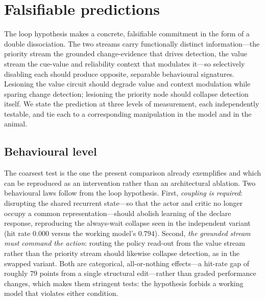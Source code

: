 \section{Falsifiable predictions}

The loop hypothesis makes a concrete, falsifiable commitment in the form of a double dissociation. The two streams carry functionally distinct information---the priority stream the grounded change-evidence that drives detection, the value stream the cue-value and reliability context that modulates it---so selectively disabling each should produce opposite, separable behavioural signatures. Lesioning the value circuit should degrade value and context modulation while sparing change detection; lesioning the priority node should collapse detection itself. We state the prediction at three levels of measurement, each independently testable, and tie each to a corresponding manipulation in the model and in the animal.

\subsection{Behavioural level}

The coarsest test is the one the present comparison already exemplifies and which can be reproduced as an intervention rather than an architectural ablation. Two behavioural laws follow from the loop hypothesis. First, \emph{coupling is required}: disrupting the shared recurrent state---so that the actor and critic no longer occupy a common representation---should abolish learning of the declare response, reproducing the always-wait collapse seen in the independent variant (hit rate $0.000$ versus the working model's $0.794$). Second, \emph{the grounded stream must command the action}: routing the policy read-out from the value stream rather than the priority stream should likewise collapse detection, as in the swapped variant. Both are categorical, all-or-nothing effects---a hit-rate gap of roughly $79$ points from a single structural edit---rather than graded performance changes, which makes them stringent tests: the hypothesis forbids a working model that violates either condition.


